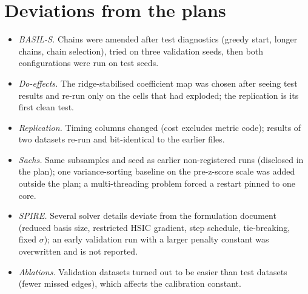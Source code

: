 \documentclass[11pt,a4paper]{article}
\begin{document}
\section{Deviations from the plans}
\label{app:dev}
\begin{itemize}[leftmargin=*,itemsep=2pt]
  \item \emph{BASIL-S.} Chains were amended after test diagnostics (greedy start, longer chains, chain selection), tried on three validation seeds, then both configurations were run on test seeds.
  \item \emph{Do-effects.} The ridge-stabilised coefficient map was chosen after seeing test results and re-run only on the cells that had exploded; the replication is its first clean test.
  \item \emph{Replication.} Timing columns changed (cost excludes metric code); results of two datasets re-run and bit-identical to the earlier files.
  \item \emph{Sachs.} Same subsamples and seed as earlier non-registered runs (disclosed in the plan); one variance-sorting baseline on the pre-z-score scale was added outside the plan; a multi-threading problem forced a restart pinned to one core.
  \item \emph{SPIRE.} Several solver details deviate from the formulation document (reduced basis size, restricted HSIC gradient, step schedule, tie-breaking, fixed $\sigma$); an early validation run with a larger penalty constant was overwritten and is not reported.
  \item \emph{Ablations.} Validation datasets turned out to be easier than test datasets (fewer missed edges), which affects the calibration constant.
\end{itemize}
\end{document}

